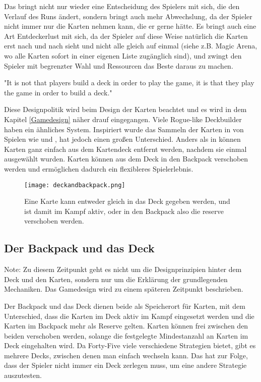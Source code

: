 Das bringt nicht nur wieder eine Entscheidung des Spielers mit sich, die den Verlauf des Runs ändert, sondern bringt auch mehr Abwechslung,
da der Spieler nicht immer nur die Karten nehmen kann, die er gerne hätte. Es bringt auch eine Art Entdeckerlust mit sich, da der Spieler
auf diese Weise natürlich die Karten erst nach und nach sieht und nicht alle gleich auf einmal (siehe z.B. Magic Arena,
wo alle Karten sofort in einer eigenen Liste zugänglich sind), 
und zwingt den Spieler mit begrenzter Wahl und Ressourcen das Beste daraus zu machen.

"It is not that players build a deck in order to play the game, it is that they play the game in order to build a deck."%

Diese Designpolitik wird beim Design der Karten beachtet und es wird in dem Kapitel \ref{Gamedesign} näher drauf eingegangen.
Viele Rogue-like Deckbuilder haben ein ähnliches System. Inspiriert wurde das Sammeln der Karten in \FF von Spielen wie  und ,
hat jedoch einen großen Unterschied. Anders als in \zB {} können Karten ganz einfach aus dem Kartendeck entfernt werden, nachdem sie einmal ausgewählt wurden.
Karten können aus dem Deck in den Backpack verschoben werden und ermöglichen dadurch ein flexibleres Spielerlebnis.


\begin{figure}[H]
    \texttt{[image: deckandbackpack.png]}
    \caption{Eine Karte kann entweder gleich in das Deck gegeben werden, und ist damit im Kampf aktiv, oder in den Backpack also die reserve verschoben werden.}
\end{figure}

\subsection{Der Backpack und das Deck}\label{backpack_and_deck}
\begin{infoBox}
Note: Zu diesem Zeitpunkt geht es nicht um die Designprinzipien hinter dem Deck und den Karten,
sondern nur um die Erklärung der grundlegenden Mechaniken. Das Gamedesign wird zu einem späteren Zeitpunkt beschrieben.
\end{infoBox}
Der Backpack und das Deck dienen beide als Speicherort für Karten, mit dem Unterschied, dass die Karten im Deck aktiv im
Kampf eingesetzt werden und die Karten im Backpack mehr als Reserve gelten.
Karten können frei zwischen den beiden verschoben werden, solange die festgelegte Mindestanzahl an Karten im Deck eingehalten wird.
Da Forty-Five viele verschiedene Strategien bietet, gibt es mehrere Decks, zwischen denen man einfach wechseln kann.
Das hat zur Folge, dass der Spieler nicht immer ein Deck zerlegen muss, um eine andere Strategie auszutesten.

